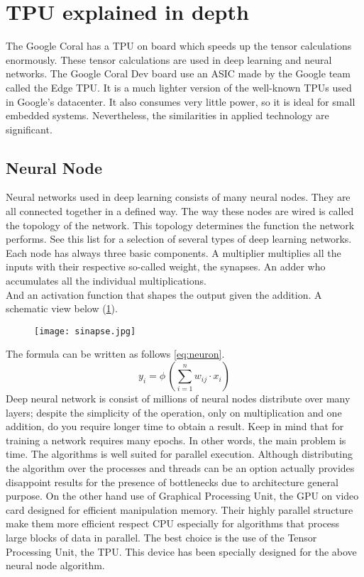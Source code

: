 \section{TPU explained in depth}
\label{sec:hard-tpu}
The Google Coral has a TPU on board which speeds up the tensor calculations
enormously. These tensor calculations are used in deep learning and neural
networks. \hfill \break 
The Google Coral Dev board use an ASIC made by the Google team called the Edge 
TPU. It is a much lighter version of the well-known TPUs used in Google's 
datacenter. \hfill \break
It also consumes very little power, so it is ideal for small embedded systems. 
Nevertheless, the similarities in applied technology are significant.\cite{TPU:explained} 
%
\subsection{Neural Node}
\label{ssec:hard-neural-node}
Neural networks used in deep learning consists of many neural nodes. They are
all connected together in a defined way. The way these nodes are wired is
called the topology of the network. This topology determines the function the
network performs. See this list for a selection of several types of deep
learning networks. Each node has always three basic components. 
A multiplier multiplies all the inputs with their respective so-called weight,
the synapses. An adder who accumulates all the individual multiplications.\\ 
And an activation function that shapes the output given the addition. 
A schematic view below (\ref{fig:neuron}).\hfill \break
%
\begin{figure}[htb]
	\centering
	\texttt{[image: sinapse.jpg]}
	\label{fig:neuron}
\end{figure}
%
\newpage
\noindent The formula can be written as follows \eqref{eq:neuron}.
\begin{equation}
\label{eq:neuron}
	y_{i} = \phi \, \left(\sum_{i=1}^{n} w_{ij}\cdot x_{i} \right)
\end{equation}
%
Deep neural network is consist of millions of neural nodes distribute over many
layers; despite the simplicity of the operation, only on multiplication and one
addition, do you require longer time to obtain a result. 
Keep in mind that for training a network requires many epochs. In other words,
the main problem is time. 
The algorithms is well suited for parallel execution. 
Although distributing the algorithm over the processes and threads can be an
option actually provides disappoint results for the presence of bottlenecks due
to architecture general purpose. 
On the other hand use of Graphical Processing Unit, the GPU on video card
designed for efficient manipulation memory. 
Their highly parallel structure make them more efficient respect CPU especially
for algorithms that process large blocks of data in parallel. 
The best choice is the use of the Tensor Processing Unit, the TPU. 
This device has been specially designed for the above neural node algorithm.
%
